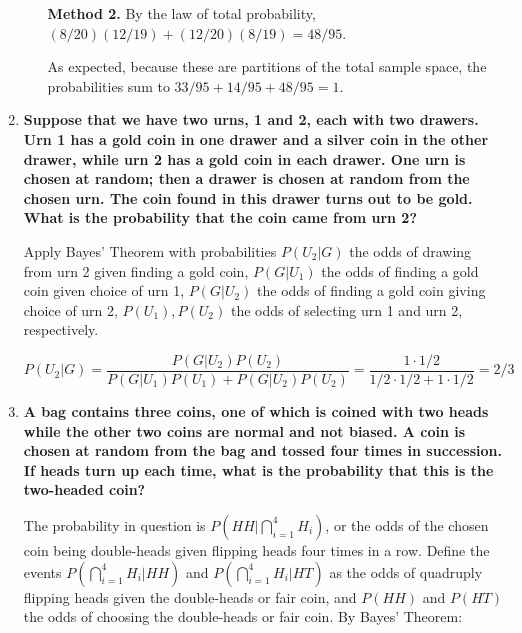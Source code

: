 \documentclass[10pt, oneside]{article}   	%
\theoremstyle{definition}
\begin{document}
\begin{enumerate}[label=3.\arabic*]
\begin{enumerate}
	\textbf{Method 2.} By the law of total probability, $(8/20) (12/19) + (12/20) (8/19) = \boxed{48/95}$.
	
	As expected, because these are partitions of the total sample space, the probabilities sum to $33/95 + 14/95 + 48/95 = 1$.
	
	\end{enumerate}

\item  \begin{tcolorbox}[
  colback=Cerulean!5!white,
  colframe=Cerulean!75!black]
\textbf{Suppose that we have two urns, 1 and 2, each with two drawers. Urn 1 has a gold coin in one drawer and a silver coin in the other drawer, while urn 2 has a gold coin in each drawer. One urn is chosen at random; then a drawer is chosen at random from the chosen urn. The coin found in this drawer turns out to be gold. What is the probability that the coin came from urn 2?}
\end{tcolorbox}

Apply Bayes' Theorem with probabilities $P(U_2 | G)$ the odds of drawing from urn 2 given finding a gold coin, $P(G | U_1)$ the odds of finding a gold coin given choice of urn 1, $P(G | U_2)$ the odds of finding a gold coin giving choice of urn 2, $P(U_1), P(U_2)$ the odds of selecting urn 1 and urn 2, respectively.

\[ P(U_2 | G) = \frac{P(G | U_2) P(U_2)}{ P(G | U_1) P(U_1) + P(G | U_2) P(U_2)} = \frac{1 \cdot 1/2}{1/2 \cdot 1/2 + 1 \cdot 1/2} = \boxed{2/3} \]

\item  \begin{tcolorbox}[
  colback=Cerulean!5!white,
  colframe=Cerulean!75!black]
\textbf{A bag contains three coins, one of which is coined with two heads while the other two coins are normal and not biased. A coin is chosen at random from the bag and tossed four times in succession. If heads turn up each time, what is the probability that this is the two-headed coin?}
\end{tcolorbox}

The probability in question is $P(HH | \bigcap^4_{i=1} H_i)$, or the odds of the chosen coin being double-heads given flipping heads four times in a row. Define the events $P(\bigcap^4_{i=1} H_i | HH)$ and $P(\bigcap^4_{i=1} H_i | HT)$ as the odds of quadruply flipping heads given the double-heads or fair coin, and $P(HH)$ and $P(HT)$ the odds of choosing the double-heads or fair coin. By Bayes' Theorem:


\end{enumerate}
\end{document}
